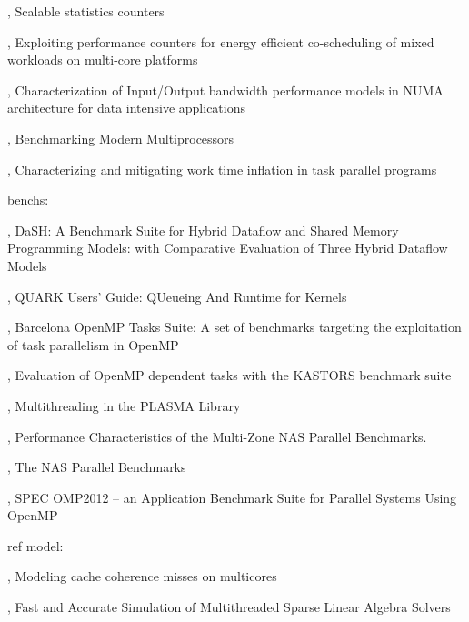 
\cite{Dice2013}, Scalable statistics counters

\cite{Libutti2014}, Exploiting performance counters for energy efficient co-scheduling of mixed workloads on multi-core platforms

\cite{Li2013}, Characterization of Input/Output bandwidth performance models in NUMA architecture for data intensive applications

\cite{Bienia2011}, Benchmarking Modern Multiprocessors

\cite{Olivier2013}, Characterizing and mitigating work time inflation in task parallel programs

benchs:

\cite{Gajinov2014}, DaSH: A Benchmark Suite for Hybrid Dataflow and Shared Memory Programming Models: with Comparative Evaluation of Three Hybrid Dataflow Models

\cite{YarKhan2011}, QUARK Users' Guide: QUeueing And Runtime for Kernels

\cite{Duran2009}, Barcelona OpenMP Tasks Suite: A set of benchmarks targeting the exploitation of task parallelism in OpenMP

\cite{Virouleau2014}, Evaluation of OpenMP dependent tasks with the KASTORS benchmark suite

\cite{Kurzak2013}, Multithreading in the PLASMA Library

\cite{Jin2004}, Performance Characteristics of the Multi-Zone NAS Parallel Benchmarks.

\cite{Bailey1994}, The NAS Parallel Benchmarks

\cite{Muller2012}, SPEC OMP2012 -- an Application Benchmark Suite for Parallel Systems Using OpenMP


ref model:

\cite{Pan2014}, Modeling cache coherence misses on multicores

\cite{Stanisic2016}, Fast and Accurate Simulation of Multithreaded Sparse Linear Algebra Solvers



